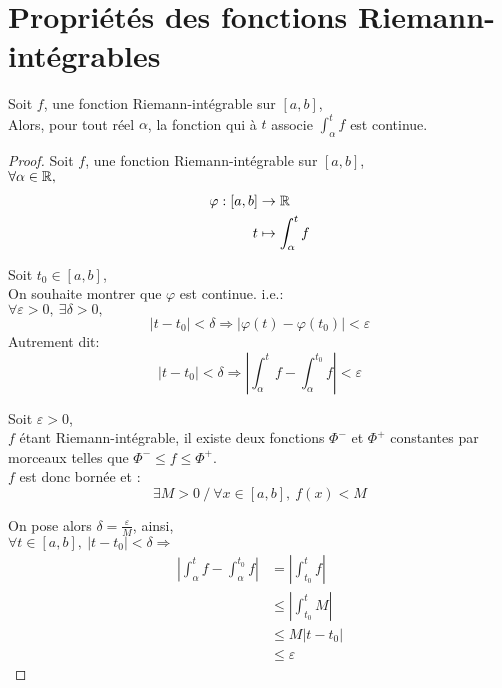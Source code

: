 \documentclass[../main.tex]{subfile}
\begin{document}
\section{Propriétés des fonctions Riemann-intégrables}
	
\begin{theo}
	Soit $f$, une fonction Riemann-intégrable sur $[a, b]$, \\
	Alors, pour tout réel $\alpha$, la fonction qui à $t$ associe $\int_\alpha^t f$ est continue.
\end{theo}

\begin{proof}
	Soit $f$, une fonction Riemann-intégrable sur $[a, b]$, \\
	$\forall \alpha \in \mathbb{R}, $
	$$
	\begin{aligned}
		\varphi : [a, b] & \to \mathbb{R}\\
		t & \mapsto \int_\alpha^t f
	\end{aligned}
	$$

	Soit $t_0 \in [a, b]$, \\
	On souhaite montrer que $\varphi$ est continue. i.e.:\\
	$\forall \varepsilon > 0, \ \exists \delta > 0,$\\
	$$|t - t_0| < \delta \Rightarrow |\varphi(t) - \varphi(t_0)| < \varepsilon$$
	Autrement dit:
	$$|t - t_0| < \delta \Rightarrow \left| \int_\alpha^t f - \int_\alpha^{t_0} f \right| < \varepsilon$$

	Soit $\varepsilon > 0$, \\
	$f$ étant Riemann-intégrable, il existe deux fonctions $\Phi^-$ et $\Phi^+$ constantes par morceaux telles que $\Phi^- \leq f \leq \Phi^+$.\\
	$f$ est donc bornée et :\\
	$$\exists M > 0 \ / \ \forall x \in [a, b], \ f(x) < M$$

	On pose alors $\delta = \frac{\varepsilon}{M}$, ainsi, \\
	$\forall t \in [a, b], \ |t - t_0| < \delta \Rightarrow$
	$$
	\begin{aligned}
		\left|\int_\alpha^t f - \int_\alpha^{t_0} f \right| &= \left|\int_{t_0}^t f \right|\\
		& \leq \left|\int_{t_0}^t M \right|\\
		& \leq M|t - t_0|\\
		& \leq \varepsilon
	\end{aligned}
	$$
	
\end{proof}
\end{document}
